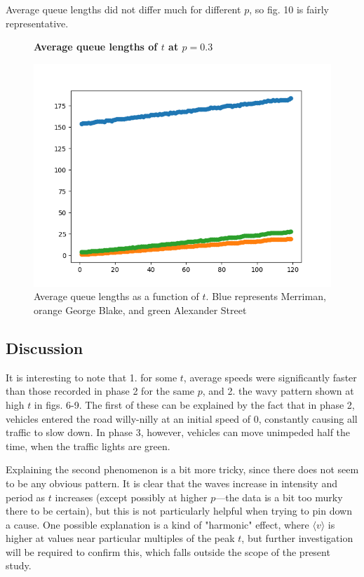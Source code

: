 \documentclass{article}
\begin{document}
Average queue lengths did not differ much for different $p$, so fig. 10 is fairly representative.

\begin{figure}
\textbf{\large Average queue lengths of $t$ at $p=0.3$}\par\medskip
{}
\includegraphics[scale = 0.55, left]{./data/phase3/queue_lengths_vs_t_p=0.3.png}
\vspace*{0.1cm}\hspace*{4.5cm}{\large $t$}
\caption{\label{fig} Average queue lengths as a function of $t$. Blue represents Merriman, orange George Blake, and green Alexander Street}
\end{figure}

\subsection*{Discussion}

It is interesting to note that 1. for some $t$, average speeds were significantly faster than those recorded in phase 2 for the same $p$, and 2. the wavy pattern shown at high $t$ in figs. 6-9. The first of these can be explained by the fact that in phase 2, vehicles entered the road willy-nilly at an initial speed of 0, constantly causing all traffic to slow down. In phase 3, however, vehicles can move unimpeded half the time, when the traffic lights are green.

Explaining the second phenomenon is a bit more tricky, since there does not seem to be any obvious pattern. It is clear that the waves increase in intensity and period as $t$ increases (except possibly at higher $p$---the data is a bit too murky there to be certain), but this is not particularly helpful when trying to pin down a cause. One possible explanation is a kind of "harmonic" effect, where $\langle v \rangle$ is higher at values near particular multiples of the peak $t$, but further investigation will be required to confirm this, which falls outside the scope of the present study.
\end{document}
